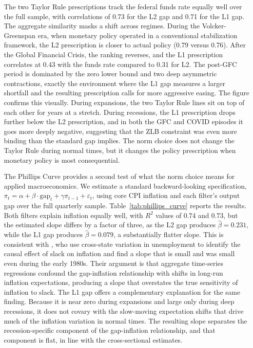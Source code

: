 \documentclass[10pt]{article}
\begin{document}
The two Taylor Rule prescriptions track the federal funds rate equally well over the full sample, with correlations of 0.73 for the L2 gap and 0.71 for the L1 gap. The aggregate similarity masks a shift across regimes. During the Volcker-Greenspan era, when monetary policy operated in a conventional stabilization framework, the L2 prescription is closer to actual policy (0.79 versus 0.76). After the Global Financial Crisis, the ranking reverses, and the L1 prescription correlates at 0.43 with the funds rate compared to 0.31 for L2. The post-GFC period is dominated by the zero lower bound and two deep asymmetric contractions, exactly the environment where the L1 gap measures a larger shortfall and the resulting prescription calls for more aggressive easing. The figure confirms this visually. During expansions, the two Taylor Rule lines sit on top of each other for years at a stretch. During recessions, the L1 prescription drops further below the L2 prescription, and in both the GFC and COVID episodes it goes more deeply negative, suggesting that the ZLB constraint was even more binding than the standard gap implies. The norm choice does not change the Taylor Rule during normal times, but it changes the policy prescription when monetary policy is most consequential.

The Phillips Curve provides a second test of what the norm choice means for applied macroeconomics. We estimate a standard backward-looking specification, $\pi_t = \alpha + \beta \cdot \text{gap}_t + \gamma \pi_{t-1} + \varepsilon_t$, using core CPI inflation and each filter's output gap over the full quarterly sample. Table~\ref{tab:phillips_curve} reports the results. Both filters explain inflation equally well, with $R^2$ values of 0.74 and 0.73, but the estimated slope differs by a factor of three, as the L2 gap produces $\hat{\beta} = 0.231$, while the L1 gap produces $\hat{\beta} = 0.079$, a substantially flatter slope. This is consistent with \citet{hazell_etal2022}, who use cross-state variation in unemployment to identify the causal effect of slack on inflation and find a slope that is small and was small even during the early 1980s. Their argument is that aggregate time-series regressions confound the gap-inflation relationship with shifts in long-run inflation expectations, producing a slope that overstates the true sensitivity of inflation to slack. The L1 gap offers a complementary explanation for the same finding. Because it is near zero during expansions and large only during deep recessions, it does not covary with the slow-moving expectation shifts that drive much of the inflation variation in normal times. The resulting slope separates the recession-specific component of the gap-inflation relationship, and that component is flat, in line with the cross-sectional estimates.
\end{document}
